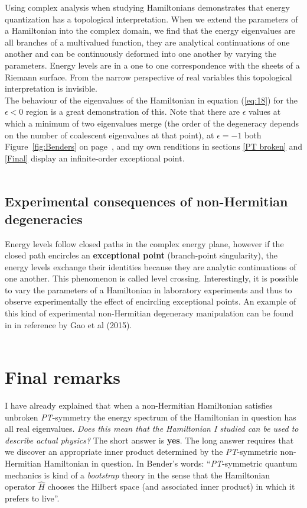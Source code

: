 \documentclass[10pt, a4paper, singlespacing]{report}
\newcommand\PT{\emph{PT}}
\begin{document}
Using complex analysis when studying Hamiltonians demonstrates that energy quantization has a topological interpretation. When we extend the parameters of a Hamiltonian into the complex domain, we find that the energy eigenvalues are all branches of a multivalued function, they are analytical continuations of one another and can be continuously deformed into one another by varying the parameters. Energy levels are in a one to one correspondence with the sheets of a Riemann surface. From the narrow perspective of real variables this topological interpretation is invisible\cite{BenderPT}.\\The behaviour of the eigenvalues of the Hamiltonian in equation (\ref{eq:18}) for the $\epsilon < 0$ region is a great demonstration of this. Note that there are $\epsilon$ values at which a minimum of two eigenvalues merge (the order of the degeneracy depends on the number of coalescent eigenvalues at that point\cite{BenderPT}\cite{Bender2017}), at $\epsilon = -1$ both Figure~\ref{fig:Benders} on page~\pageref{fig:Benders}, and my own renditions in sections \ref{PT broken} and \ref{Final} display an infinite-order exceptional point.\\\\

\subsection{Experimental consequences of non-Hermitian degeneracies}\label{Experimental}
Energy levels follow closed paths in the complex energy plane, however if the closed path encircles an \textbf{exceptional point} (branch-point singularity), the energy levels exchange their identities because they are analytic continuations of one another\cite{BenderPT}\cite{Bender2017}. This phenomenon is called level crossing. Interestingly, it is possible to vary the parameters of a Hamiltonian in laboratory experiments and thus to observe experimentally the effect of encircling exceptional points\cite{Bender2017}. An example of this kind of experimental non-Hermitian degeneracy manipulation can be found in in reference \cite{Ostrovskaya} by Gao et al (2015).\\\\

\section{Final remarks}\label{Future}

I have already explained that when a non-Hermitian Hamiltonian satisfies unbroken \PT-symmetry the energy spectrum of the Hamiltonian in question has all real eigenvalues. \emph{Does this mean that the Hamiltonian I studied can be used to describe actual physics?} The short answer is \textbf{yes}. The long answer requires that we discover an appropriate inner product determined by the \PT-symmetric non-Hermitian Hamiltonian in question. In Bender's words: ``\PT-symmetric quantum mechanics is kind of a \emph{bootstrap} theory in the sense that the Hamiltonian operator $\hat{H}$ chooses the Hilbert space (and associated inner product) in which it prefers to live''\cite{BenderPT}.
\end{document}
